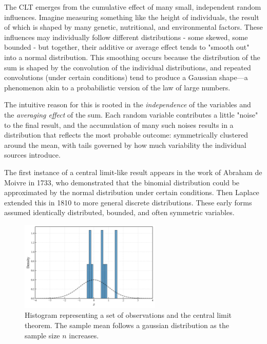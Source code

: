 \documentclass{book}
\begin{document}
\medskip

The CLT emerges from the cumulative effect of many small, independent random influences. Imagine measuring something like the height of individuals, the result of which is shaped by many genetic, nutritional, and environmental factors. These influences may individually follow different distributions - some skewed, some bounded - but together, their additive or average effect tends to "smooth out" into a normal distribution. This smoothing occurs because the distribution of the sum is shaped by the convolution of the individual distributions, and repeated convolutions (under certain conditions) tend to produce a Gaussian shape—a phenomenon akin to a probabilistic version of the law of large numbers.

\medskip

The intuitive reason for this is rooted in the \textit{independence} of the variables and the \textit{averaging effect} of the sum. Each random variable contributes a little "noise" to the final result, and the accumulation of many such noises results in a distribution that reflects the most probable outcome: symmetrically clustered around the mean, with tails governed by how much variability the individual sources introduce.

\medskip

The first instance of a central limit-like result appears in the work of Abraham de Moivre in 1733, who demonstrated that the binomial distribution could be approximated by the normal distribution under certain conditions. Then Laplace extended this in 1810 to more general discrete distributions. These early forms assumed identically distributed, bounded, and often symmetric variables.

\begin{figure}[ht]
    \centering
    \includegraphics[width=0.6\textwidth]{figures/chapter3/clt_1.png}
    \caption{Histogram representing a set of observations and the central limit theorem. The sample mean follows a gaussian distribution as the sample size $n$ increases.}
    \label{fig:random}
\end{figure}
\end{document}
